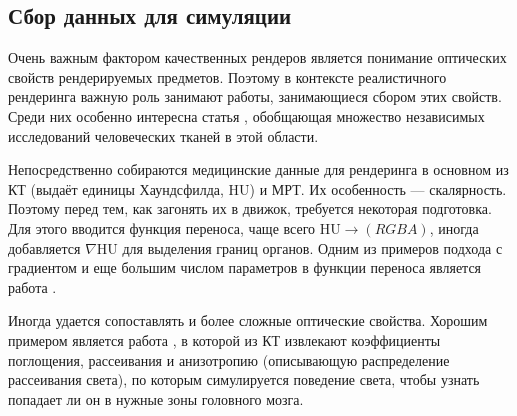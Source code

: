 \subsection{Сбор данных для симуляции}

Очень важным фактором качественных рендеров является понимание оптических свойств рендерируемых предметов. Поэтому в контексте реалистичного рендеринга важную роль занимают работы, занимающиеся сбором этих свойств. Среди них особенно интересна статья \cite{Jacques_2013}, обобщающая множество независимых исследований человеческих тканей в этой области.

Непосредственно собираются медицинские данные для рендеринга в основном из КТ (выдаёт единицы Хаундсфилда, HU) и МРТ. Их особенность --- скалярность. Поэтому перед тем, как загонять их в движок, требуется некоторая подготовка. Для этого вводится функция переноса, чаще всего $\mathrm{HU} \to (RGBA)$, иногда добавляется $\nabla\mathrm{HU}$ для выделения границ органов. Одним из примеров подхода с градиентом и еще большим числом параметров в функции переноса является работа \cite{kroes2012exposure}.

Иногда удается сопоставлять и более сложные оптические свойства. Хорошим примером является работа \cite{verleker2014optical}, в которой из КТ извлекают коэффициенты поглощения, рассеивания и анизотропию (описывающую распределение рассеивания света), по которым симулируется поведение света, чтобы узнать попадает ли он в нужные зоны головного мозга.